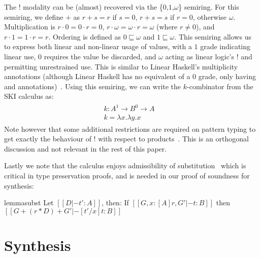 \begin{example}

\label{example:01omega}
  The $!$ modality can be (almost) recovered via the \{$0$,$1$,$\omega$\} semiring. For this semiring, we define $+$ as $r + s = r$ if $s = 0$, $r + s = s$ if $r = 0$, otherwise $\omega$. Multiplication is $r \cdot 0 = 0 \cdot r = 0$, $r \cdot \omega = \omega \cdot r = \omega$ (where $r \neq 0$), and $r \cdot 1 = 1 \cdot r = r$. Ordering is defined as $0 \sqsubseteq \omega$ and $1 \sqsubseteq \omega$. This semiring allows us to express both linear and non-linear usage of values, with a $1$ grade indicating linear use, $0$ requires the value be discarded, and $\omega$ acting as linear logic's ! and permitting unrestrained use. This is similar to Linear Haskell's multiplicity annotations (although Linear Haskell has no equivalent of a $0$ grade, only having  and  annotations)~\cite{DBLP:journals/pacmpl/BernardyBNJS18}. Using this semiring, we can write the $k$-combinator from the SKI calculus as:
  \begin{align*}
    \begin{array}{ll}
    k : A^{1} \rightarrow B ^{0} \rightarrow A &
    \\
    k = \lambda x. \lambda y . x &
    \end{array}
    \end{align*}
Note however that some additional restrictions are required on pattern typing to get exactly the behaviour of $!$ with respect to products~\cite{hughes:lirmm-03271465}.
This is an orthogonal discussion and not relevant in the rest of this paper.
\end{example}

Lastly we note that the calculus enjoys admissibility of
substitution~\cite{DBLP:journals/pacmpl/AbelB20}
which is critical in type preservation proofs,
and is needed in our proof of soundness for synthesis:
%
\begin{restatable}{lemma}{subst}
\label{lemma:substitution}
Let $[[ D |- t' : A]]$, then:
If $[[ {G, x : [A] r} , G' |- t : B]]$
then $[[ G + (r * D) + G' |- [ t' / x ] t : B ]]$
\end{restatable}



\section{Synthesis}


